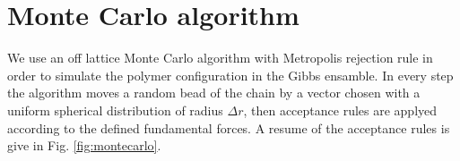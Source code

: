 \documentclass[12pt,a4paper,notitlepage]{article}
\newcommand{\naps}{\emph{NAPs}\xspace}
\begin{document}
\section{Monte Carlo algorithm}
We use an off lattice Monte Carlo algorithm with Metropolis rejection
rule in order to simulate the polymer configuration in the Gibbs
ensamble. 
In every step
the algorithm moves a random bead of the chain by a vector
chosen with a uniform spherical distribution of radius $\Delta r$,
then acceptance rules are applyed according to the defined
fundamental forces. A resume of the acceptance rules is give in
Fig. \ref{fig:montecarlo}.
\end{document}

